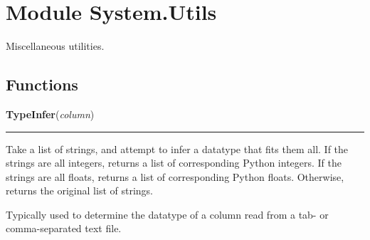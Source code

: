 %
%
%


\section{Module System.Utils}

    \label{System:Utils}
Miscellaneous utilities.



  \subsection{Functions}

    \label{System:Utils:TypeInfer}

    \vspace{0.5ex}

\hspace{.8\funcindent}\begin{boxedminipage}{\funcwidth}

    \raggedright \textbf{TypeInfer}(\textit{column})

    \vspace{-1.5ex}

    \rule{\textwidth}{0.5\fboxrule}
\setlength{\parskip}{2ex}
    Take a list of strings, and attempt to infer a datatype that fits them 
    all. If the strings are all integers, returns a list of corresponding 
    Python integers. If the strings are all floats, returns a list of 
    corresponding Python floats. Otherwise, returns the original list of 
    strings.

    Typically used to determine the datatype of a column read from a tab- 
    or comma-separated text file.

\setlength{\parskip}{1ex}
    \end{boxedminipage}

